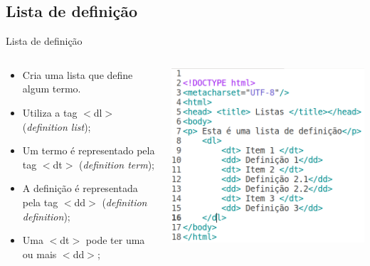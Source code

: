 \documentclass{beamer}
\begin{document}
\subsection{Lista de definição}
\begin{frame}{Lista de definição}
  \begin{columns}
    \begin{column}{0.45 \textwidth}
     \begin{itemize}
      \item Cria uma lista que define algum termo.
       \item Utiliza a tag $<$dl$>$ (\textit{definition list});
       \item Um termo é representado pela tag $<$dt$>$ 
(\textit{definition term});
       \item A definição é representada pela tag $<$dd$>$ 
      (\textit{definition definition});
       \item Uma $<$dt$>$ pode ter uma ou mais $<$dd$>$;
     \end{itemize}
    \end{column}
    \begin{column}{0.5\textwidth}
     \includegraphics[height=0.55\paperheight]{fig/aula1/html4.png}
    \end{column}
  \end{columns}
\end{frame}
\end{document}
